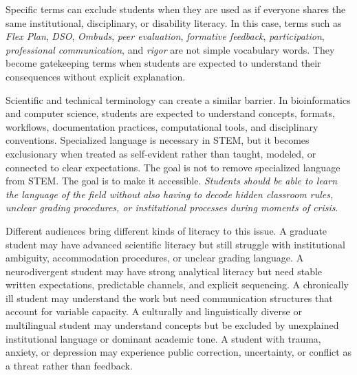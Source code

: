 
Specific terms can exclude students when they are used as if everyone shares the same institutional, disciplinary, or disability literacy. In this case, terms such as \textit{Flex Plan}, \textit{DSO}, \textit{Ombuds}, \textit{peer evaluation}, \textit{formative feedback}, \textit{participation}, \textit{professional communication}, and \textit{rigor} are not simple vocabulary words. They become gatekeeping terms when students are expected to understand their consequences without explicit explanation.

Scientific and technical terminology can create a similar barrier. In bioinformatics and computer science, students are expected to understand concepts, formats, workflows, documentation practices, computational tools, and disciplinary conventions. Specialized language is necessary in STEM, but it becomes exclusionary when treated as self-evident rather than taught, modeled, or connected to clear expectations. The goal is not to remove specialized language from STEM. The goal is to make it accessible. \textit{Students should be able to learn the language of the field without also having to decode hidden classroom rules, unclear grading procedures, or institutional processes during moments of crisis}.


Different audiences bring different kinds of literacy to this issue. A graduate student may have advanced scientific literacy but still struggle with institutional ambiguity, accommodation procedures, or unclear grading language. A neurodivergent student may have strong analytical literacy but need stable written expectations, predictable channels, and explicit sequencing. A chronically ill student may understand the work but need communication structures that account for variable capacity. A culturally and linguistically diverse or multilingual student may understand concepts but be excluded by unexplained institutional language or dominant academic tone. A student with trauma, anxiety, or depression may experience public correction, uncertainty, or conflict as a threat rather than feedback.

